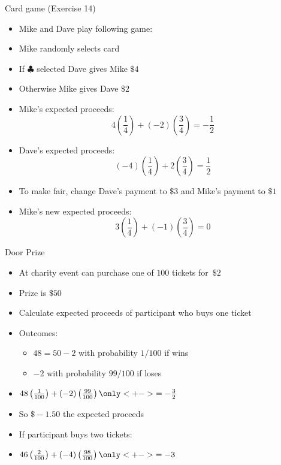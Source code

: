 \documentclass[handout]{beamer}
\theoremstyle{definition}
\begin{document}
\begin{frame}{Card game (Exercise 14)}
\begin{itemize}
\item Mike and Dave play following game:
\item Mike randomly selects card
\item If $\clubsuit$ selected Dave gives Mike $\$4$
\item Otherwise Mike gives Dave $\$2$
\item Mike's expected proceeds:
\[4\left(\frac{1}{4}\right)+\left(-2\right)\left(\frac{3}{4}\right)
=-\frac{1}{2}\]
\item Dave's expected proceeds:
\[\left(-4\right)\left(\frac{1}{4}\right)
+2\left(\frac{3}{4}\right)
=\frac{1}{2}\]
\item To make fair, change Dave's payment to $\$3$
and Mike's payment to $\$1$
\item Mike's new expected proceeds:
\[3\left(\frac{1}{4}\right)+\left(-1\right)\left(\frac{3}{4}\right)=0\]
\end{itemize}
\end{frame}

\begin{frame}{Door Prize}
\begin{itemize}
\item At charity event can purchase one of $100$ tickets for~$\$2$
\item Prize is $\$50$
\item Calculate expected proceeds of participant who buys one ticket
\item Outcomes:
\begin{itemize}
\item $48=50-2$ with probability $1/100$ if wins
\item $-2$ with probability $99/100$ if loses
\end{itemize} 
\item $48\left(\frac{1}{100}\right)+\left(-2\right)
\left(\frac{99}{100}\right)
\only<+->{=-\frac{3}{2}}$
\item So $\$-1.50$ the expected proceeds 
\item If participant buys \alert{two} tickets:
\item $46\left(\frac{2}{100}\right)+\left(-4\right)
\left(\frac{98}{100}\right)
\only<+->{=-3}$
\end{itemize}
\end{frame}
\end{document}

